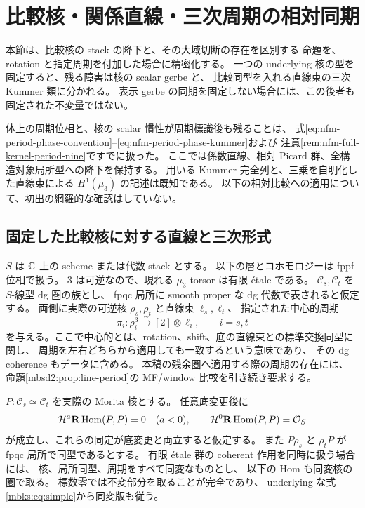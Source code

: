 \section{比較核・関係直線・三次周期の相対同期}
\label{mbks:sec:synchronization}

本節は、比較核の stack の降下と、その大域切断の存在を区別する
命題を、rotation と指定周期を付加した場合に精密化する。
一つの underlying 核の型を固定すると、残る障害は核の scalar gerbe と、
比較同型を入れる直線束の三次 Kummer 類に分かれる。
表示 gerbe の同期を固定しない場合には、この後者も固定された不変量ではない。

体上の周期位相と、核の scalar 慣性が周期標識後も残ることは、
式\eqref{eq:nfm-period-phase-convention}--\eqref{eq:nfm-period-phase-kummer}および
注意\ref{rem:nfm-full-kernel-period-nine}ですでに扱った。
ここでは係数直線、相対 Picard 群、全構造対象局所型への降下を保持する。
用いる Kummer 完全列と、三乗を自明化した直線束による
$H^1(\mu_3)$ の記述は既知である\cite{NFMStacksKummer}。
以下の相対比較への適用について、初出の網羅的な確認はしていない。

\subsection{固定した比較核に対する直線と三次形式}

$S$ は $\mathbb C$ 上の scheme または代数 stack とする。
以下の層とコホモロジーは fppf 位相で扱う。
$3$ は可逆なので、現れる $\mu_3$-torsor は有限 \'etale である。
$\mathcal C_s,\mathcal C_t$ を $S$-線型 dg 圏の族とし、
fpqc 局所に smooth proper な dg 代数で表されると仮定する。
両側に実際の可逆核 $\rho_s,\rho_t$ と直線束 $\ell_s,\ell_t$、
指定された中心的周期
\begin{equation}\label{mbks:eq:periods}
 \pi_i:\rho_i^3\xrightarrow{\sim}[2]\otimes\ell_i,\qquad i=s,t
\end{equation}
を与える。ここで中心的とは、rotation、shift、底の直線束との標準交換同型に関し、
周期を左右どちらから適用しても一致するという意味であり、
その dg coherence もデータに含める。
本稿の残余圏へ適用する際の周期の存在には、
命題\ref{mbsd2:prop:line-period}の MF/window 比較を引き続き要求する。

$P:\mathcal C_s\simeq\mathcal C_t$ を実際の Morita 核とする。
任意底変更後に
\begin{equation}\label{mbks:eq:simple}
 \mathcal H^a\mathbf R\operatorname{Hom}(P,P)=0\quad(a<0),
 \qquad
 \mathcal H^0\mathbf R\operatorname{Hom}(P,P)=\mathcal O_S
\end{equation}
が成立し、これらの同定が底変更と両立すると仮定する。
また $P\rho_s$ と $\rho_tP$ が fpqc 局所で同型であるとする。
有限 \'etale 群の coherent 作用を同時に扱う場合には、
核、局所同型、周期をすべて同変なものとし、
以下の Hom も同変核の圏で取る。
標数零では不変部分を取ることが完全であり、
underlying な式\eqref{mbks:eq:simple}から同変版も従う。

